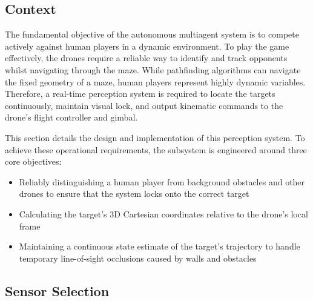 \documentclass{report_template_oxford}
\begin{document}
\subsection{Context}

The fundamental objective of the autonomous multiagent system is to compete actively against human players in a dynamic environment. To play the game effectively, the drones require a reliable way to identify and track opponents whilst navigating through the maze. While pathfinding algorithms can navigate the fixed geometry of a maze, human players represent highly dynamic variables. Therefore, a real-time perception system is required to locate the targets continuously, maintain visual lock, and output kinematic commands to the drone's flight controller and gimbal.

This section details the design and implementation of this perception system. To achieve these operational requirements, the subsystem is engineered around three core objectives:
\begin{itemize}
    \item Reliably distinguishing a human player from background obstacles and other drones to ensure that the system locks onto the correct target
    \item Calculating the target's 3D Cartesian coordinates relative to the drone's local frame
    \item Maintaining a continuous state estimate of the target's trajectory to handle temporary line-of-sight occlusions caused by walls and obstacles
\end{itemize}

\subsection{Sensor Selection} %
\label{Sensor Selection}
\end{document}
